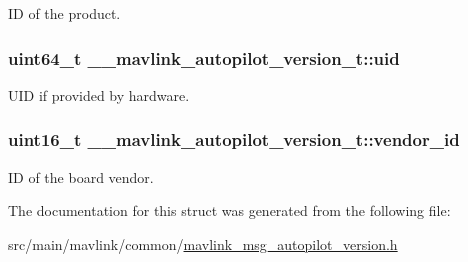 I\+D of the product. 

\hypertarget{struct____mavlink__autopilot__version__t_af748a25ba9a0f3126cf5f5e65d17ebce}{
\subsubsection[{uid}]{\setlength{\rightskip}{0pt plus 5cm}uint64\+\_\+t \+\_\+\+\_\+mavlink\+\_\+autopilot\+\_\+version\+\_\+t\+::uid}}\label{struct____mavlink__autopilot__version__t_af748a25ba9a0f3126cf5f5e65d17ebce}


U\+I\+D if provided by hardware. 

\hypertarget{struct____mavlink__autopilot__version__t_aefea6df48be4162c0e2f7293a7a476c3}{
\subsubsection[{vendor\+\_\+id}]{\setlength{\rightskip}{0pt plus 5cm}uint16\+\_\+t \+\_\+\+\_\+mavlink\+\_\+autopilot\+\_\+version\+\_\+t\+::vendor\+\_\+id}}\label{struct____mavlink__autopilot__version__t_aefea6df48be4162c0e2f7293a7a476c3}


I\+D of the board vendor. 



The documentation for this struct was generated from the following file\+:\begin{DoxyCompactItemize}
\item 
src/main/mavlink/common/\hyperlink{mavlink__msg__autopilot__version_8h}{mavlink\+\_\+msg\+\_\+autopilot\+\_\+version.\+h}\end{DoxyCompactItemize}
